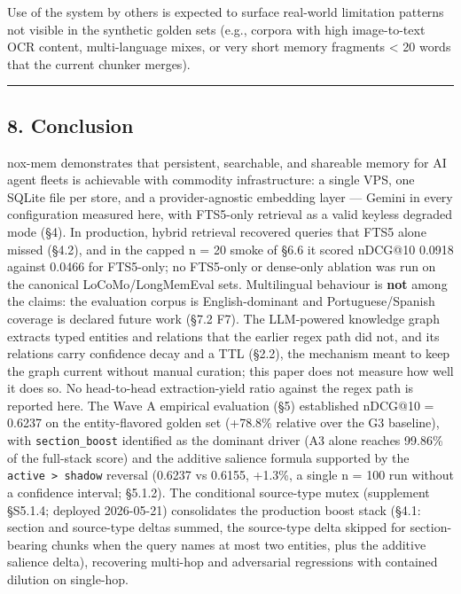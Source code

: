 \documentclass[
]{article}
\begin{document}
Use of the system by others is expected to surface real-world limitation
patterns not visible in the synthetic golden sets (e.g., corpora with
high image-to-text OCR content, multi-language mixes, or very short
memory fragments \textless{} 20 words that the current chunker merges).

\begin{center}\rule{0.5\linewidth}{0.5pt}\end{center}

\subsection{8. Conclusion}\label{conclusion}

nox-mem demonstrates that persistent, searchable, and shareable memory
for AI agent fleets is achievable with commodity infrastructure: a
single VPS, one SQLite file per store, and a provider-agnostic embedding
layer --- Gemini in every configuration measured here, with FTS5-only
retrieval as a valid keyless degraded mode (§4). In production, hybrid
retrieval recovered queries that FTS5 alone missed (§4.2), and in the
capped n = 20 smoke of §6.6 it scored nDCG@10 0.0918 against 0.0466 for
FTS5-only; no FTS5-only or dense-only ablation was run on the canonical
LoCoMo/LongMemEval sets. Multilingual behaviour is \textbf{not} among
the claims: the evaluation corpus is English-dominant and
Portuguese/Spanish coverage is declared future work (§7.2 F7). The
LLM-powered knowledge graph extracts typed entities and relations that
the earlier regex path did not, and its relations carry confidence decay
and a TTL (§2.2), the mechanism meant to keep the graph current without
manual curation; this paper does not measure how well it does so. No
head-to-head extraction-yield ratio against the regex path is reported
here. The Wave A empirical evaluation (§5) established nDCG@10 = 0.6237
on the entity-flavored golden set (+78.8\% relative over the G3
baseline), with \texttt{section\_boost} identified as the dominant
driver (A3 alone reaches 99.86\% of the full-stack score) and the
additive salience formula supported by the
\texttt{active\ \textgreater{}\ shadow} reversal (0.6237 vs 0.6155,
+1.3\%, a single n = 100 run without a confidence interval; §5.1.2). The
conditional source-type mutex (supplement §S5.1.4; deployed 2026-05-21)
consolidates the production boost stack (§4.1: section and source-type
deltas summed, the source-type delta skipped for section-bearing chunks
when the query names at most two entities, plus the additive salience
delta), recovering multi-hop and adversarial regressions with contained
dilution on single-hop.
\end{document}
